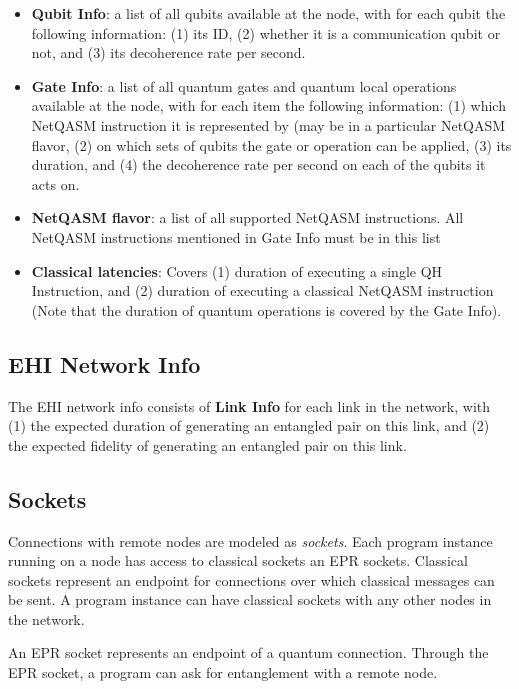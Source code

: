 \begin{itemize}
\item \textbf{Qubit Info}: a list of all qubits available at the node, with for each qubit the following information: 
(1) its ID,
(2) whether it is a communication qubit or not, and
(3) its decoherence rate per second.
\item \textbf{Gate Info}: a list of all quantum gates and quantum local operations available at the node, with for each item the following information:
(1) which NetQASM instruction it is represented by (may be in a particular NetQASM flavor,
(2) on which sets of qubits the gate or operation can be applied,
(3) its duration, and
(4) the decoherence rate per second on each of the qubits it acts on.

\item \textbf{NetQASM flavor}: a list of all supported NetQASM instructions. All NetQASM instructions mentioned in Gate Info must be in this list

\item \textbf{Classical latencies}:
Covers
(1) duration of executing a single QH Instruction, and
(2) duration of executing a classical NetQASM instruction (Note that the duration of quantum operations is covered by the Gate Info).
\end{itemize}

\subsection{EHI Network Info}
The EHI network info consists of \textbf{Link Info} for each link in the network, with
(1) the expected duration of generating an entangled pair on this link, and
(2) the expected fidelity of generating an entangled pair on this link.



\subsection{Sockets}
Connections with remote nodes are modeled as \textit{sockets}.
Each program instance running on a node has access to classical sockets an EPR sockets.
Classical sockets represent an endpoint for connections over which classical messages can be sent.
A program instance can have classical sockets with any other nodes in the network.

An EPR socket represents an endpoint of a quantum connection.
Through the EPR socket, a program can ask for entanglement with a remote node.



